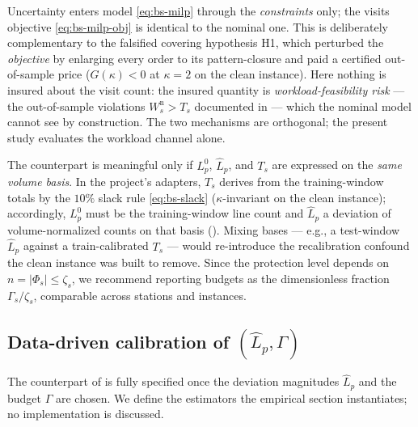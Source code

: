 \begin{remark}
\label{rem:bs-objective}
Uncertainty enters model \eqref{eq:bs-milp} through the \emph{constraints}
only; the visits objective \eqref{eq:bs-milp-obj} is identical to the nominal
one. This is deliberately complementary to the falsified covering hypothesis
H1, which perturbed the \emph{objective} by enlarging every order to its
pattern-closure and paid a certified out-of-sample price ($G(\kappa) < 0$ at
$\kappa = 2$ on the clean instance). Here nothing is insured about the visit
count: the insured quantity is \emph{workload-feasibility risk} --- the
out-of-sample violations $W^{\mathrm n}_s > T_s$ documented in
 ---
which the nominal model cannot see by construction. The two mechanisms are
orthogonal; the present study evaluates the workload channel alone.
\end{remark}

\begin{remark}
\label{rem:bs-basis}
The counterpart is meaningful only if $L^0_p$, $\hat L_p$, and $T_s$ are
expressed on the \emph{same volume basis}. In the project's adapters, $T_s$
derives from the training-window totals by the $10\%$ slack rule
\eqref{eq:bs-slack} ($\kappa$-invariant on the clean instance); accordingly,
$L^0_p$ must be the training-window line count and $\hat L_p$ a deviation
of volume-normalized counts on that basis (). Mixing
bases --- e.g., a test-window $\hat L_p$ against a train-calibrated $T_s$ ---
would re-introduce the recalibration confound the clean instance was built to
remove. Since the protection level depends on $n = |\Phi_s| \le \zeta_s$, we
recommend reporting budgets as the dimensionless fraction
$\Gamma_s / \zeta_s$, comparable across stations and instances.
\end{remark}

\subsection{Data-driven calibration of $(\hat L_p, \Gamma)$}
\label{sec:calibration}

The counterpart of  is fully specified once the
deviation magnitudes $\hat L_p$ and the budget $\Gamma$ are chosen. We define
the estimators the empirical section instantiates; no implementation is
discussed.

